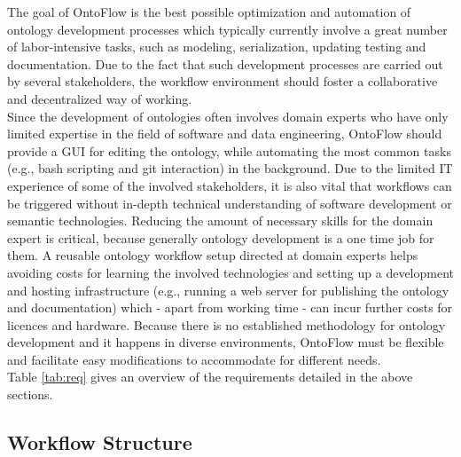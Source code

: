 \documentclass[sigconf]{acmart}
\begin{document}
The goal of OntoFlow is the best possible optimization and automation of ontology development processes which typically currently involve a great number of labor-intensive tasks, such as modeling, serialization, updating testing and documentation. Due to the fact that such development processes are carried out by several stakeholders, the workflow environment should foster a collaborative and decentralized way of working.\\
Since the development of ontologies often involves domain experts who have only limited expertise in the field of software and data engineering, OntoFlow should provide a GUI for editing the ontology, while automating the most common tasks (e.g., bash scripting and git interaction) in the background. Due to the limited IT experience of some of the involved stakeholders, it is also vital that workflows can be triggered without in-depth technical understanding of software development or semantic technologies. Reducing the amount of necessary skills for the domain expert is critical, because generally ontology development is a one time job for them. A reusable ontology workflow setup directed at domain experts helps avoiding costs for learning the involved technologies and setting up a development and hosting infrastructure (e.g., running a web server for publishing the ontology and documentation) which - apart from working time - can incur further costs for licences and hardware. Because there is no established methodology for ontology development and it happens in diverse environments, OntoFlow must be flexible and facilitate easy modifications to accommodate for different needs.\\
Table \ref{tab:req} gives an overview of the requirements detailed in the above sections.

\subsection{Workflow Structure}
\end{document}

